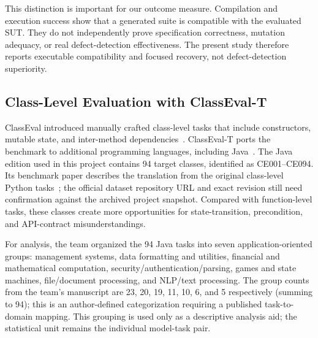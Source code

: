 This distinction is important for our outcome measure. Compilation and execution success show that a generated suite is compatible with the evaluated SUT. They do not independently prove specification correctness, mutation adequacy, or real defect-detection effectiveness. The present study therefore reports executable compatibility and focused recovery, not defect-detection superiority.

\subsection{Class-Level Evaluation with ClassEval-T}
\label{subsec:classeval_t}
ClassEval introduced manually crafted class-level tasks that include constructors, mutable state, and inter-method dependencies~\cite{du2024classeval}. ClassEval-T ports the benchmark to additional programming languages, including Java~\cite{xue2025classevalt}. The Java edition used in this project contains 94 target classes, identified as CE001--CE094. Its benchmark paper describes the translation from the original class-level Python tasks~\cite{xue2025classevalt}; the official dataset repository URL and exact revision still need confirmation against the archived project snapshot. Compared with function-level tasks, these classes create more opportunities for state-transition, precondition, and API-contract misunderstandings.

For analysis, the team organized the 94 Java tasks into seven application-oriented groups: management systems, data formatting and utilities, financial and mathematical computation, security/authentication/parsing, games and state machines, file/document processing, and NLP/text processing. The group counts from the team's manuscript are 23, 20, 19, 11, 10, 6, and 5 respectively (summing to 94); this is an author-defined categorization requiring a published task-to-domain mapping. This grouping is used only as a descriptive analysis aid; the statistical unit remains the individual model-task pair.
